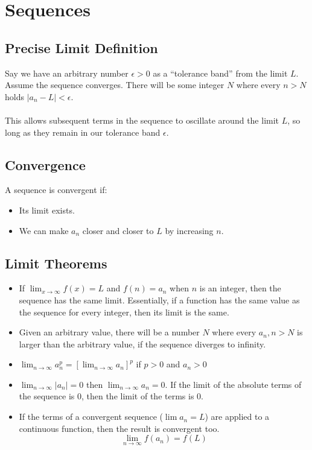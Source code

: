 \documentclass[12pt]{article}
\begin{document}
\section{Sequences}


\subsection{Precise Limit Definition}

Say we have an arbitrary number $\epsilon > 0$ as a ``tolerance band'' from the limit $L$.
Assume the sequence converges.
There will be some integer $N$ where every $n > N$ holds $\left|a_n - L\right| < \epsilon$.
\\
\\
This allows subsequent terms in the sequence to oscillate around the limit $L$, so long as they remain in our tolerance band $\epsilon$.


\subsection{Convergence}

A sequence is convergent if:
\begin{itemize}
\item Its limit exists.
\item We can make $a_n$ closer and closer to $L$ by increasing $n$.
\end{itemize}


\subsection{Limit Theorems}

\begin{itemize}
\item If $\lim_{x\to\infty} f(x) = L$ and $f(n) = a_n$ when $n$ is an integer, then the sequence has the same limit.
    Essentially, if a function has the same value as the sequence for every integer, then its limit is the same.
\item Given an arbitrary value, there will be a number $N$ where every $a_n, n > N$ is larger than the arbitrary value, if the sequence diverges to infinity.
\item $\lim_{n\to\infty} a_n^p = \left[\lim_{n\to\infty} a_n\right]^p$ if $p > 0$ and $a_n > 0$
\item $\lim_{n\to\infty} \left|a_n\right| = 0$ then $\lim_{n\to\infty} a_n = 0$. If the limit of the absolute terms of the sequence is 0, then the limit of the terms is 0.
\item If the terms of a convergent sequence ($\lim a_n = L$) are applied to a continuous function, then the result is convergent too. $$\lim_{n\to\infty} f(a_n) = f(L)$$
\end{itemize}
\end{document}
